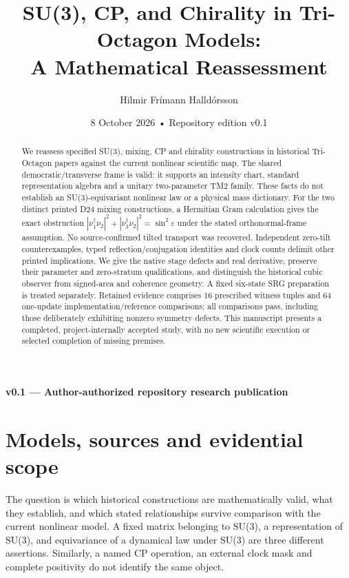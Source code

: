 \documentclass[11pt,a4paper]{article}
\title{SU(3), CP, and Chirality in Tri-Octagon Models:\\ A Mathematical Reassessment}
\author{Hilmir Frímann Halldórsson}
\date{8 October 2026 • Repository edition v0.1}
\numberwithin{equation}{section}
\begin{document}
\maketitle
\begin{center}\textbf{v0.1 — Author-authorized repository research publication}\end{center}
\begin{abstract}
We reassess specified SU(3), mixing, CP and chirality constructions in historical Tri-Octagon papers against the current nonlinear scientific map. The shared democratic/transverse frame is valid: it supports an intensity chart, standard representation algebra and a unitary two-parameter TM2 family. These facts do not establish an SU(3)-equivariant nonlinear law or a physical mass dictionary. For the two distinct printed D24 mixing constructions, a Hermitian Gram calculation gives the exact obstruction $|\nu_1^\dagger\nu_2|^2+|\nu_3^\dagger\nu_2|^2=\sin^2\varepsilon$ under the stated orthonormal-frame assumption. No source-confirmed tilted transport was recovered. Independent zero-tilt counterexamples, typed reflection/conjugation identities and clock counts delimit other printed implications. We give the native stage defects and real derivative, preserve their parameter and zero-stratum qualifications, and distinguish the historical cubic observer from signed-area and coherence geometry. A fixed six-state SRG preparation is treated separately. Retained evidence comprises 16 prescribed witness tuples and 64 one-update implementation/reference comparisons; all comparisons pass, including those deliberately exhibiting nonzero symmetry defects. This manuscript presents a completed, project-internally accepted study, with no new scientific execution or selected completion of missing premises.
\end{abstract}

\section{Models, sources and evidential scope}\label{sec:scope}
The question is which historical constructions are mathematically valid, what they establish, and which stated relationships survive comparison with the current nonlinear model. A fixed matrix belonging to SU(3), a representation of SU(3), and equivariance of a dynamical law under SU(3) are three different assertions. Similarly, a named CP operation, an external clock mask and complete positivity do not identify the same object.
\end{document}

